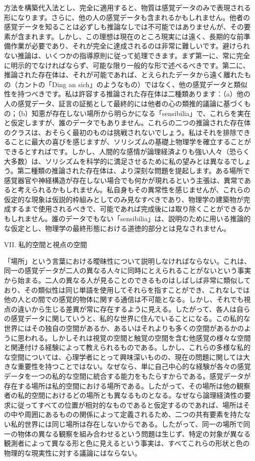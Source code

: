 \documentclass[a4paper,11pt,openany]{ltjsbook}
\begin{document}
方法を構築代入法とし、完全に適用すると、物質は感覚データのみで表現される形になります。さらに、他の人の感覚データも含まれるかもしれません。他者の感覚データを知ることは必ずしも推論なしでは不可能ではありませんが、その要素が含まれます。しかし、この理想は現在のところ現実には遠く、長期的な前準備作業が必要であり、それが完全に達成されるのは非常に難しいです。避けられない推論は、いくつかの指導原則に従って処理できます。まず第一に、常に完全に明示的でなければならず、可能な限り一般的な形で述べるべきです。第二に、推論された存在体は、それが可能であれば、とえられたデータから遠く離れたもの（カントの「Ding an sich」のようなもの）ではなく、他の感覚データと類似性を持つべきです。私は許容する推論された存在体は二種類あります：（a）他の人の感覚データ、証言の証拠として最終的には他者の心の類推的議論に基づくもの；（b）知恵が存在しない場所から明らかになる「sensibilia」で、これらを実在と仮定しますが、誰のデータでもありません。これらの二つの推論された存在体のクラスは、おそらく最初のものは挑戦されないでしょう。私はそれを排除できることに最大の喜びを感じますが、ソリシズムの基礎上物理学を確立することができるとすればです。しかし、人間的な感情が論理経済よりも強い人々（恐らく大多数）は、ソリシズムを科学的に満足させるために私の望みとは異なるでしょう。第二種類の推論された存在体は、より深刻な問題を提起します。ある場所で感覚器官や神経構造が存在しない場合でも何かが現れるという主張は、異常であると考えられるかもしれません。私自身もその異常性を感じませんが、これらの仮定的な現象は仮説的枠組みとしてのみ見なすべきであり、物理学の建築物が完成するまで使用されるべきで、可能であれば完成後には取り除くことができるかもしれません。誰のデータでもない「sensibilia」は、説明のために用いる推論的な仮定とし、物理学の最終形態における道徳的部分とは見なされません。

VII. 私的空間と視点の空間

「場所」という言葉における曖昧性について説明しなければならない。これは、同一の感覚データが二人の異なる人々に同時にとえられることがないという事実から始まる。二人の異なる人が見ることのできるものはしばしば非常に類似しており、その類似性は同じ単語を使用してそれらを指すことができ、これなしでは他の人との間での感覚的物体に関する通信は不可能となる。しかし、それでも視点の違いから生じる差異が常に存在するように見える。したがって、各人は自らの感覚データに関していうと、私的な世界に住んでいることになる。この私的な世界にはその独自の空間があるか、あるいはそれよりも多くの空間があるかのように思われる。しかしそれは視覚の空間と触覚の空間を含む他感覚の様々な空間と関連付ける経験によって教えられるものである。しかし、これらの多様な私的な空間については、心理学者にとって興味深いものの、現在の問題に関しては大きな重要性を持つことではない。なぜなら、単に自己中心的な経験が各々の感覚データを一つの私的な空間に統合する能力をもたらすからである。感覚データが存在する場所は私的空間における場所である。したがって、その場所は他の観察者の私的空間におけるどの場所とも異なるものとなる。なぜなら論理経済性の要求に従ってすべての位置が相対的なものであると仮定するのであれば、場所はその中や周囲にあるものの関係によって定義されるため、二つの共有要素を持たない私的世界には同じ場所は存在しないからである。したがって、同一の場所で同一の物体の異なる観察を組み合わせるという問題は生じず、特定の対象が異なる観測者によって異なる形と色に見えるという事実は、すべてこれらの形状と色の物理的な現実性に対する議論にはならない。
\end{document}
